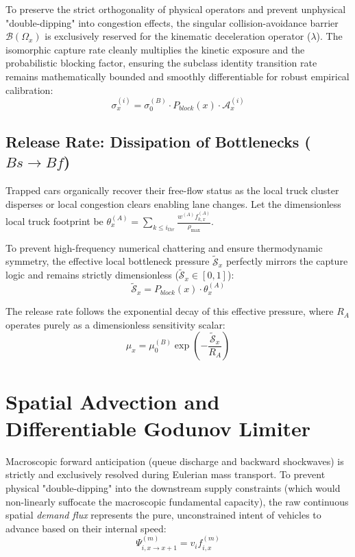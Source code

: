 \documentclass[11pt,a4paper]{article}
\begin{document}
To preserve the strict orthogonality of physical operators and prevent unphysical "double-dipping" into congestion effects, the singular collision-avoidance barrier $\mathcal{B}(\Omega_x)$ is exclusively reserved for the kinematic deceleration operator ($\lambda$). The isomorphic capture rate cleanly multiplies the kinetic exposure and the probabilistic blocking factor, ensuring the subclass identity transition rate remains mathematically bounded and smoothly differentiable for robust empirical calibration:
\begin{equation}
\sigma_{x}^{(i)} = \sigma_0^{(B)} \cdot P_{block}(x) \cdot \mathcal{A}_{x}^{(i)}
\end{equation}

\subsection{Release Rate: Dissipation of Bottlenecks ($Bs \rightarrow Bf$)}
Trapped cars organically recover their free-flow status as the local truck cluster disperses or local congestion clears enabling lane changes. Let the dimensionless local truck footprint be $\theta_{x}^{(A)} = \sum_{k \le i_{thr}} \frac{w^{(A)} f_{k,x}^{(A)}}{\rho_{\max}}$.

To prevent high-frequency numerical chattering and ensure thermodynamic symmetry, the effective local bottleneck pressure $\tilde{\mathcal{S}}_x$ perfectly mirrors the capture logic and remains strictly dimensionless ($\tilde{\mathcal{S}}_x \in [0,1]$):
\begin{equation}
\tilde{\mathcal{S}}_x = P_{block}(x) \cdot \theta_{x}^{(A)}
\end{equation}

The release rate follows the exponential decay of this effective pressure, where $R_A$ operates purely as a dimensionless sensitivity scalar:
\begin{equation}
\mu_{x} = \mu_0^{(B)} \exp\left(-\frac{\tilde{\mathcal{S}}_{x}}{R_A}\right)
\end{equation}

\section{Spatial Advection and Differentiable Godunov Limiter}
Macroscopic forward anticipation (queue discharge and backward shockwaves) is strictly and exclusively resolved during Eulerian mass transport. To prevent physical "double-dipping" into the downstream supply constraints (which would non-linearly suffocate the macroscopic fundamental capacity), the raw continuous spatial \textit{demand flux} represents the pure, unconstrained intent of vehicles to advance based on their internal speed:
\begin{equation}
\Psi_{i,x\rightarrow x+1}^{(m)} = v_{i} f_{i,x}^{(m)}
\end{equation}
\end{document}
